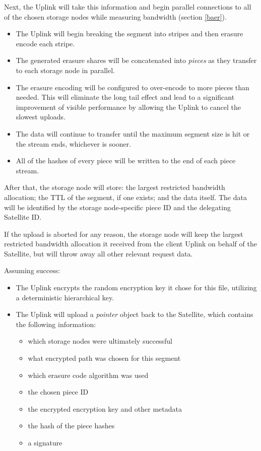\documentclass[8pt,fleqn,openany]{book}
\begin{document}
Next, the Uplink will take this information and begin parallel connections to
all of the chosen storage nodes while measuring bandwidth (section \ref{baer}).

\begin{itemize}
\item The Uplink will begin breaking the segment into stripes and then
  erasure encode each stripe.
\item The generated erasure shares will be concatenated into {\em pieces} as they
  transfer to each storage node in parallel.
\item The erasure encoding will be configured to over-encode to more pieces
  than needed. This will eliminate the long tail effect and lead to a
  significant improvement of visible performance by allowing the Uplink to
  cancel the slowest uploads.
\item The data will continue to transfer until the maximum segment size is hit
  or the stream ends, whichever is sooner.
\item All of the hashes of every piece will be written to the end of each
  piece stream.
\end{itemize}

After that, the storage node will store: the largest restricted bandwidth allocation;
the TTL of the segment, if one exists; and the data itself. The data will
be identified by the storage node-specific piece ID and the delegating Satellite
ID.

If the upload is aborted for any reason, the storage node will keep the
largest restricted bandwidth allocation it received from the client Uplink on
behalf of the Satellite, but will throw away all other relevant request data.

Assuming success:

\begin{itemize}
\item The Uplink encrypts the random encryption key it chose for this file,
  utilizing a deterministic hierarchical key.
\item The Uplink will upload a {\em pointer} object back to the Satellite, which
  contains the following information:
  \begin{itemize}
  \item which storage nodes were ultimately successful
  \item what encrypted path was chosen for this segment
  \item which erasure code algorithm was used
  \item the chosen piece ID
  \item the encrypted encryption key and other metadata
  \item the hash of the piece hashes
  \item a signature
  \end{itemize}
\end{itemize}
\end{document}
